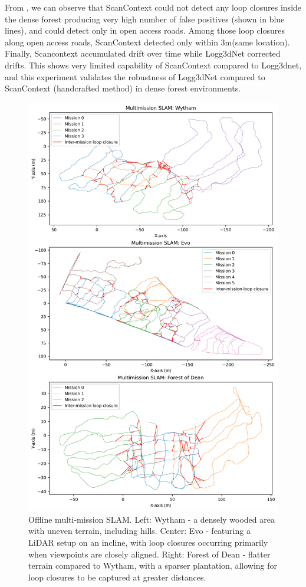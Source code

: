 From , we can observe that ScanContext could not detect any loop closures inside the dense forest producing very high number of false positives (shown in blue lines), and could detect only in open access roads. Among those loop closures along open access roads, ScanContext detected only within 3m(same location). Finally, Scancontext accumulated drift over time while Logg3dNet corrected drifts. This shows very limited capability of ScanContext compared to Logg3dnet, and this experiment validates the robustness of Logg3dNet compared to ScanContext (handcrafted method) in dense forest environments.



\begin{figure}[htbp]
  \centering
  \includegraphics[width=0.90\columnwidth]{pics/exp_3_1_multimission_slam_big2.png}
  \caption{Offline multi-mission SLAM. Left: Wytham - a densely wooded area with uneven terrain, including hills. Center: Evo - featuring a LiDAR setup on an incline, with loop closures occurring primarily when viewpoints are closely aligned. Right: Forest of Dean - flatter terrain compared to Wytham, with a sparser plantation, allowing for loop closures to be captured at greater distances. }
  \label{fig:exp_multi_mission}
\end{figure}


